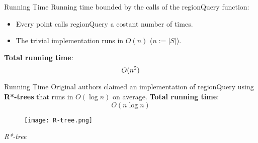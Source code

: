 \documentclass[aspectratio=169]{beamer}
\begin{document}
\begin{comment}
    \begin{minipage}[c]{0.44\textwidth}
        \begin{figure}
            \centering
            \texttt{[image: dbscan\_final.png]}
        \end{figure}
    \end{minipage}
    \hfill
    \begin{minipage}[c]{0.5\textwidth}
        {\color{gray}4. Add \textbf{border points} and return the \textbf{clusters} found.}\\
        Find border points by checking if unclustered points neighbor a core point.
    \end{minipage}

    
\end{frame}
\end{comment}

\begin{frame}{Running Time}
    Running time bounded by the calls of the regionQuery function:
    \begin{itemize}
        \item Every point calls regionQuery a costant number of times.
        \item The trivial implementation runs in $O(n)$ ($n:=|S|$).
    \end{itemize}

    \vspace{0.5cm}

    \textbf{Total running time}: \[\Large{O(n^2)}\]
\end{frame}

\begin{frame}{Running Time}
    Original authors claimed an implementation of regionQuery using \textbf{R*-trees} that runs in $O(\log n)$ on average. \textbf{Total running time}:
    \[
        O(n\log n)
    \]

    \vspace{0.3cm}

    \begin{figure}
        \centering
        \texttt{[image: R-tree.png]}
    \end{figure}
    \begin{center}
        \textit{R*-tree}
    \end{center}

\end{frame}
\end{document}
